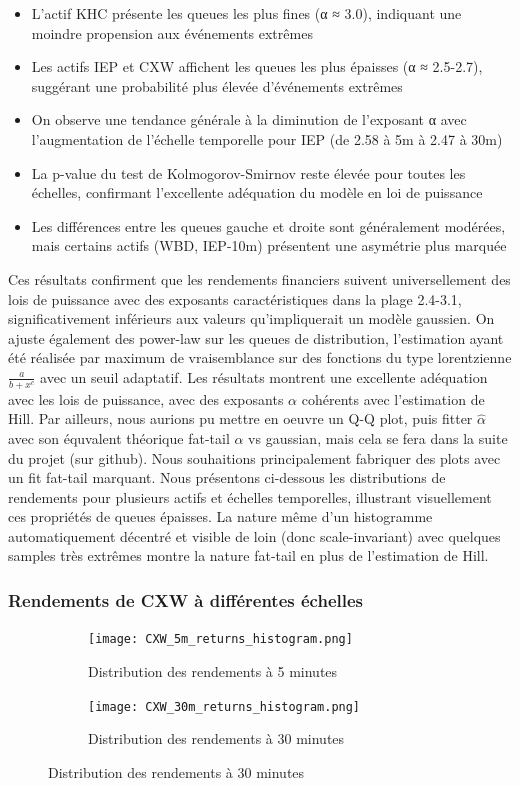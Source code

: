 \documentclass[10pt,a4paper]{article}
\theoremstyle{definition}
\theoremstyle{remark}
\begin{document}
\begin{itemize}
\begin{itemize}
    \item L'actif KHC présente les queues les plus fines (α ≈ 3.0), indiquant une moindre propension aux événements extrêmes
    \item Les actifs IEP et CXW affichent les queues les plus épaisses (α ≈ 2.5-2.7), suggérant une probabilité plus élevée d'événements extrêmes
    \item On observe une tendance générale à la diminution de l'exposant α avec l'augmentation de l'échelle temporelle pour IEP (de 2.58 à 5m à 2.47 à 30m)
    \item La p-value du test de Kolmogorov-Smirnov reste élevée pour toutes les échelles, confirmant l'excellente adéquation du modèle en loi de puissance
    \item Les différences entre les queues gauche et droite sont généralement modérées, mais certains actifs (WBD, IEP-10m) présentent une asymétrie plus marquée
\end{itemize}
Ces résultats confirment que les rendements financiers suivent universellement des lois de puissance avec des exposants caractéristiques dans la plage 2.4-3.1, significativement inférieurs aux valeurs qu'impliquerait un modèle gaussien. On ajuste également des power-law sur les queues de distribution, l'estimation ayant été réalisée par maximum de vraisemblance sur des fonctions du type lorentzienne $\frac{a}{b+x^c}$ avec un seuil adaptatif. Les résultats montrent une excellente adéquation avec les lois de puissance, avec des exposants $\alpha$ cohérents avec l'estimation de Hill. Par ailleurs, nous aurions pu mettre en oeuvre un Q-Q plot, puis fitter $\hat \alpha$ avec son équvalent théorique fat-tail $\alpha$ vs gaussian, mais cela se fera dans la suite du projet (sur github). Nous souhaitions principalement fabriquer des plots avec un fit fat-tail marquant. Nous présentons ci-dessous les distributions de rendements pour plusieurs actifs et échelles temporelles, illustrant visuellement ces propriétés de queues épaisses. La nature même d'un histogramme automatiquement décentré et visible de loin (donc scale-invariant) avec quelques samples très extrêmes montre la nature fat-tail en plus de l'estimation de Hill.

\subsubsection{Rendements de CXW à différentes échelles}

\begin{figure}[H]
    \centering
    \begin{subfigure}[b]{0.45\textwidth}
        \texttt{[image: CXW\_5m\_returns\_histogram.png]}
        \caption{Distribution des rendements à 5 minutes}
        \label{fig:CXW_5m_moved}
    \end{subfigure}
    \hfill
    \hfill
    \begin{subfigure}[b]{0.45\textwidth}
        \texttt{[image: CXW\_30m\_returns\_histogram.png]}
        \caption{Distribution des rendements à 30 minutes}
        \label{fig:CXW_30m_moved}
    \end{subfigure}
    

\end{figure}
\end{itemize}
\end{document}
